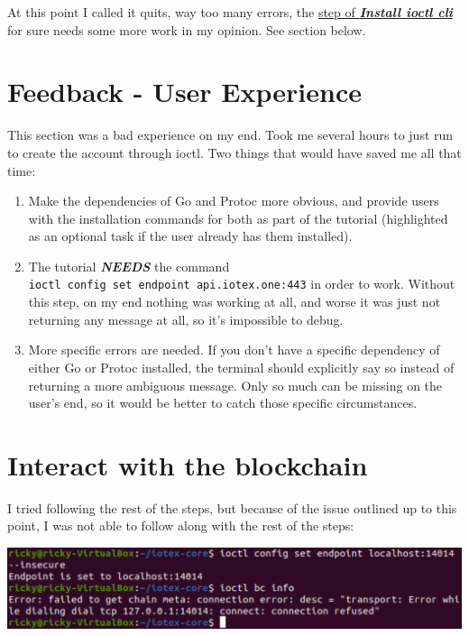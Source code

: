 \documentclass[
]{book}
\begin{document}
At this point I called it quits, way too many errors, the
\href{https://docs.iotex.io/software-tools/get-started/install-ioctl-cli}{step
of \textbf{\emph{Install ioctl cli}}} for sure needs some more work in
my opinion. See section below.

\hypertarget{feedback---user-experience}{%
\section{Feedback - User Experience}\label{feedback---user-experience}}

This section was a bad experience on my end. Took me several hours to
just run to create the account through ioctl. Two things that would have
saved me all that time:

\begin{enumerate}
\def\labelenumi{\arabic{enumi}.}
\item
  Make the dependencies of Go and Protoc more obvious, and provide users
  with the installation commands for both as part of the tutorial
  (highlighted as an optional task if the user already has them
  installed).
\item
  The tutorial \textbf{\emph{NEEDS}} the command
  \texttt{ioctl\ config\ set\ endpoint\ api.iotex.one:443} in order to
  work. Without this step, on my end nothing was working at all, and
  worse it was just not returning any message at all, so it's impossible
  to debug.
\item
  More specific errors are needed. If you don't have a specific
  dependency of either Go or Protoc installed, the terminal should
  explicitly say so instead of returning a more ambiguous message. Only
  so much can be missing on the user's end, so it would be better to
  catch those specific circumstances.
\end{enumerate}

\hypertarget{interact-with-the-blockchain}{%
\section{Interact with the
blockchain}\label{interact-with-the-blockchain}}

I tried following the rest of the steps, but because of the issue
outlined up to this point, I was not able to follow along with the rest
of the steps:

\includegraphics{images/interact_error.PNG}
\end{document}
